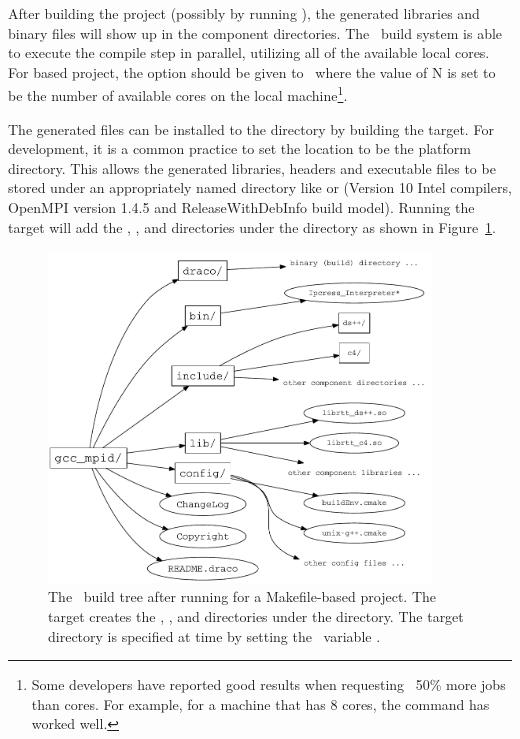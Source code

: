 After building the project (possibly by running \make), the generated libraries and binary files will show up in the component directories.  The \draco\ build system is able to execute the compile step in parallel, utilizing all of the available local cores.  For  based project, the option  should be given to \make\ where the value of N is set to be the number of available cores on the local machine\footnote{Some developers have reported good results when requesting ~50\% more jobs than cores.  For example, for a machine that has 8 cores, the command  has worked well.}.  

The generated files can be installed to the  directory by building the  target.  For development, it is a common practice to set the  location to be the platform  directory.   This allows the generated libraries, headers and executable files to be stored under an appropriately named directory like  or  (Version 10 Intel compilers, OpenMPI version 1.4.5 and ReleaseWithDebInfo build model).  Running the  target will add the , ,  and  directories under the   directory as shown in Figure~\ref{fig:build_tree_post_install}.
\begin{figure}
  \centerline{\includegraphics[width=4in]{fig/build_tree_post_install}}
  \caption{The \draco\ build tree after running  for a Makefile-based project.  The  target creates  the , ,  and  directories under the   directory.  The target directory is specified at  time by setting the \cmake\ variable .}
  \label{fig:build_tree_post_install}
\end{figure}

